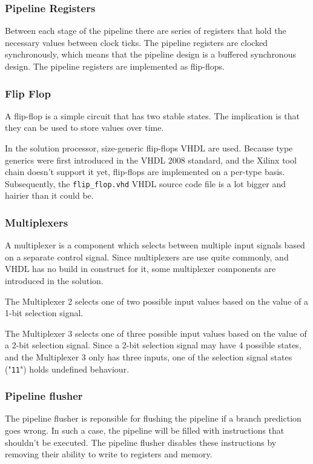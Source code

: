 \subsubsection{Pipeline Registers}

Between each stage of the pipeline there are series of registers that hold the necessary values between clock ticks.
The pipeline registers are clocked synchronously, which means that the pipeline design is a buffered synchronous design.
The pipeline registers are implemented as flip-flops.


\subsubsection{Flip Flop}

A flip-flop is a simple circuit that has two stable states.
The implication is that they can be used to store values over time.

In the solution processor, size-generic flip-flops VHDL are used.
Because type generics were first introduced in the VHDL 2008 standard\cite{vhdl2008}, and the Xilinx tool chain doesn't support it yet, flip-flops are implemented on a per-type basis.
Subsequently, the \texttt{flip\_flop.vhd} VHDL source code file is a lot bigger and hairier than it could be.

\subsubsection{Multiplexers}

A multiplexer is a component which selects between multiple input signals based on a separate control signal.
Since multiplexers are use quite commonly, and VHDL has no build in construct for it, some multiplexer components are introduced in the solution.


The Multiplexer 2 selects one of two possible input values based on the value of a 1-bit selection signal.


The Multiplexer 3 selects one of three possible input values based on the value of a 2-bit selection signal.
Since a 2-bit selection signal may have 4 possible states, and the Multiplexer 3 only has three inputs, one of the selection signal states ("\texttt{11}") holds undefined behaviour.

\subsubsection{Pipeline flusher}

The pipeline flusher is reponsible for flushing the pipeline if a branch prediction goes wrong.
In such a case, the pipeline will be filled with instructions that shouldn't be executed.
The pipeline flusher disables these instructions by removing their ability to write to registers and memory.
